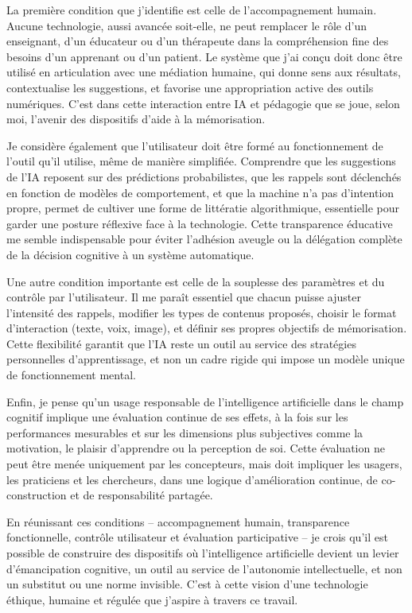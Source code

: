 \documentclass[11pt,a4paper]{report}
\begin{document}
La première condition que j’identifie est celle de l’accompagnement humain. Aucune technologie, aussi avancée soit-elle, ne peut remplacer le rôle d’un enseignant, d’un éducateur ou d’un thérapeute dans la compréhension fine des besoins d’un apprenant ou d’un patient. Le système que j’ai conçu doit donc être utilisé en articulation avec une médiation humaine, qui donne sens aux résultats, contextualise les suggestions, et favorise une appropriation active des outils numériques. C’est dans cette interaction entre IA et pédagogie que se joue, selon moi, l’avenir des dispositifs d’aide à la mémorisation.

Je considère également que l’utilisateur doit être formé au fonctionnement de l’outil qu’il utilise, même de manière simplifiée. Comprendre que les suggestions de l’IA reposent sur des prédictions probabilistes, que les rappels sont déclenchés en fonction de modèles de comportement, et que la machine n’a pas d’intention propre, permet de cultiver une forme de littératie algorithmique, essentielle pour garder une posture réflexive face à la technologie. Cette transparence éducative me semble indispensable pour éviter l’adhésion aveugle ou la délégation complète de la décision cognitive à un système automatique.

Une autre condition importante est celle de la souplesse des paramètres et du contrôle par l’utilisateur. Il me paraît essentiel que chacun puisse ajuster l’intensité des rappels, modifier les types de contenus proposés, choisir le format d’interaction (texte, voix, image), et définir ses propres objectifs de mémorisation. Cette flexibilité garantit que l’IA reste un outil au service des stratégies personnelles d’apprentissage, et non un cadre rigide qui impose un modèle unique de fonctionnement mental.

Enfin, je pense qu’un usage responsable de l’intelligence artificielle dans le champ cognitif implique une évaluation continue de ses effets, à la fois sur les performances mesurables et sur les dimensions plus subjectives comme la motivation, le plaisir d’apprendre ou la perception de soi. Cette évaluation ne peut être menée uniquement par les concepteurs, mais doit impliquer les usagers, les praticiens et les chercheurs, dans une logique d’amélioration continue, de co-construction et de responsabilité partagée.

En réunissant ces conditions – accompagnement humain, transparence fonctionnelle, contrôle utilisateur et évaluation participative – je crois qu’il est possible de construire des dispositifs où l’intelligence artificielle devient un levier d’émancipation cognitive, un outil au service de l’autonomie intellectuelle, et non un substitut ou une norme invisible. C’est à cette vision d’une technologie éthique, humaine et régulée que j’aspire à travers ce travail.
\end{document}
